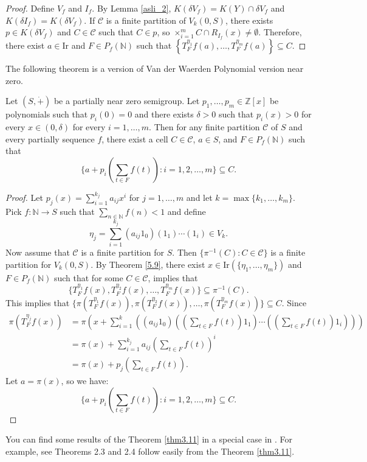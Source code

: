 \documentclass[twoside,11pt]{article}
\begin{document}
\begin{proof}
	Define $V_f$ and $I_f$. By Lemma \ref{asli_2}, $K(\delta V_f) = K(Y) \cap \delta V_f$ and $K(\delta I_f) = K(\delta V_f)$. If $\mathcal{C}$ is a finite partition of $V_k(0,S)$, there exists $p \in K(\delta V_f)$ and $C \in \mathcal{C}$ such that $C \in p$, so $\times_{i=1}^m C \cap R_{I_f}(x) \neq \emptyset$. Therefore, there exist $a \in \mathrm{Ir}$ and $F \in P_f(\mathbb{N})$ such that $\left\{ T_F^{\eta_1}f(a), \ldots, T_F^{\eta_m}f(a) \right\} \subseteq C$. 
\end{proof}

The following theorem is a version of Van der Waerden Polynomial version near zero.

\begin{theorem}\label{thm3.11}
	Let $(S,\dot{+})$ be a partially near zero semigroup. Let $p_1,\ldots,p_m \in \mathbb{Z}[x]$ be polynomials such that $p_i(0) = 0$ and there exists $\delta > 0$ such that $p_i(x) > 0$ for every $x \in (0,\delta)$ for every $i=1,\ldots ,m$. Then for any finite partition $\mathcal{C}$ of \( S \) and every partially sequence $f$, there exist a cell $C \in \mathcal{C}$, $a \in S$, and $F \in P_f(\mathbb{N})$ such that 
	\[
	\{ a + p_i(\sum_{t \in F} f(t)) : i = 1,2,\ldots,m \} \subseteq C.
	\] 
\end{theorem}

\begin{proof}
	Let $p_j(x) = \sum_{i=1}^{k_j} a_{i j} x^{i}$ for $j=1,\ldots,m$ and let $k = \max\{k_1,\ldots,k_m\}$. Pick $f:\mathbb{N}\to S$ such that $\sum_{n \in \mathbb{N}} f(n) < 1$ and define 
	\[
	\eta_j = \sum_{i=1}^{k_j} (a_{i j} 1_0) (1_1) \cdots (1_i) \in V_k.
	\] 
	Now assume that $\mathcal{C}$ is a finite partition for $S$. Then $\{\pi^{-1}(C) : C \in \mathcal{C}\}$ is a finite partition for $V_k(0,S)$. By Theorem \ref{5.9}, there exist $x \in \mathrm{Ir}(\{\eta_1,\ldots,\eta_m\})$ and $F \in P_f(\mathbb{N})$ such that for some $C \in \mathcal{C}$, implies that
	\[
	\{ T_F^{\eta_1}f(x), T_F^{\eta_2}f(x), \ldots, T_F^{\eta_m}f(x) \} \subseteq \pi^{-1}(C).
	\]
	This implies that $\{\pi(T_F^{\eta_1}f(x)), \pi(T_F^{\eta_2}f(x)), \ldots, \pi(T_F^{\eta_m}f(x))\} \subseteq C$. Since 
	\begin{align*}	
	\pi(T_F^{\eta_j}f(x)) &= \pi\left( x + \sum_{i=1}^k \left( (a_{i j} 1_0) \left( \left( \sum_{t \in F} f(t) \right) 1_1 \right) \cdots \left( \left( \sum_{t \in F} f(t) \right) 1_i \right) \right) \right) \\
	&= \pi(x) + \sum_{i=1}^{k_j} a_{i j} \left( \sum_{t \in F} f(t) \right)^i \\
	&= \pi(x) + p_j\left( \sum_{t \in F} f(t) \right).
	\end{align*}
	Let $a = \pi(x)$, so we have:
	\[
	\{ a + p_i(\sum_{t \in F} f(t)) : i = 1,2,\ldots,m \} \subseteq C.
	\]
\end{proof}
You can find some results of the Theorem  \ref{thm3.11} in a special case in \cite{De}. For example, see Theorems 2.3 and 2.4 follow easily from the Theorem  \ref{thm3.11}.
\end{document}
